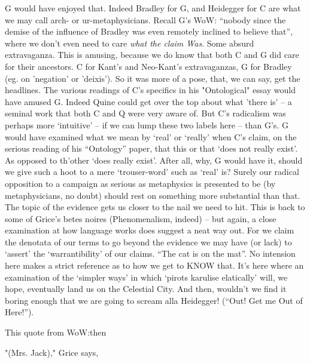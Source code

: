 \documentclass[10pt,titlepage]{book}
\begin{document}
G would have enjoyed that.
Indeed Bradley for G, and Heidegger for C are what we may call arch- or ur-metaphysicians.
Recall G's WoW: ``nobody since the demise of the influence of Bradley was even remotely inclined to believe that'', where we don't even need to care {\it what the claim Was}.
Some absurd extravaganza.
This is amusing, because we do know that both C and G did care for their ancestors.
C for Kant's and Neo-Kant's extravaganzas, G for Bradley (eg. on 'negation' or 'deixis').
So it was more of a pose, that, we can say, get the headlines.
The various readings of C's specifics in his "Ontological" essay would have amused G.
Indeed Quine could get over the top about what 'there is' -- a seminal work that both C and Q were very aware of.
But C's radicalism was perhaps more `intuitive' -- if we can lump these two labels here -- than G's.
G would have examined what we mean by `real' or `really' when C's claim, on the serious reading of his ``Ontology'' paper, that  this or that `does not really exist'.
As opposed to th'other `does really exist'.
After all, why, G would have it, should we give such a hoot to a mere `trouser-word' such as `real' is?
Surely our radical opposition to a campaign as serious as metaphysics is presented to be (by metaphysicians, no doubt) should rest on something more substantial than that.
The topic of the evidence gets us closer to the nail we need to hit. 
This is back to some of Grice's betes noires  (Phenomenalism, indeed) -- but again, a close examination at how language works  does suggest a neat way out. 
For we claim the denotata of our terms to go beyond  the evidence we may have (or lack) to `assert' the `warrantibility' of our  claims.
``The cat is on the mat''.
No intension here makes a strict reference as to how we get to KNOW that.
It's here where an examination of the `simpler ways' in which `pirots karulise elatically' will, we hope, eventually land us on the Celestial City.
And then, wouldn't we find it boring enough that we are going to scream alla Heidegger!
(``Out! Get me Out of Here!'').

This quote from WoW:then
 
"(Mrs. Jack)," Grice says,
\end{document}
